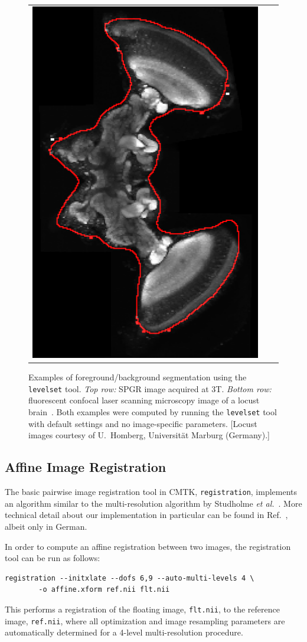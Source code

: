 \documentclass{InsightArticle}
\begin{document}
\begin{figure}[tbp]
\begin{center}
\begin{tabular}{ccc}
\includegraphics[width=.3\linewidth]{img/levelset_locust_ovl}
\end{tabular}
\end{center}
\caption{Examples of foreground/background segmentation using the {\tt
levelset} tool. {\em Top row:\/} SPGR image acquired at 3T. {\em Bottom
row:\/} fluorescent confocal laser scanning microscopy image of a locust
brain~\cite{KuryRohlKrof:2008}. Both examples were computed by running the
{\tt levelset} tool with default settings and no image-specific
parameters. [Locust images courtesy of U.~Homberg, Universit\"at Marburg
(Germany).]  }
\label{fig:Levelset}
\end{figure}

\subsection{Affine Image Registration}

The basic pairwise image registration 
tool in CMTK, \verb|registration|,  implements an algorithm similar to the multi-resolution
algorithm by Studholme {\em et al.\/}~\cite{StudHillHawk:1997}. More technical
detail about our implementation in particular can be found in
Ref.~\cite{Rohlfing:2000}, albeit only in German.

In order to compute an affine registration  between
two images, the registration tool can be run as follows:
\begin{verbatim}
registration --initxlate --dofs 6,9 --auto-multi-levels 4 \
        -o affine.xform ref.nii flt.nii
\end{verbatim}
This performs a registration of the floating image, \verb|flt.nii|, to the
reference image, \verb|ref.nii|, where all optimization and image resampling
parameters are automatically determined for a 4-level multi-resolution
procedure. 
\end{document}
